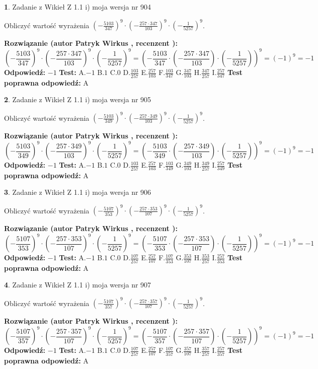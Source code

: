 \documentclass[12pt, a4paper]{article}
\theoremstyle{definition} %
\newtheorem{zad}{}
\newcommand{\zadStart}[1]{\begin{zad}#1\newline}
\newcommand{\zadStop}{\end{zad}}
\newcommand{\rozwStart}[2]{\noindent \textbf{Rozwiązanie (autor #1 , recenzent #2): }\newline}
\newcommand{\rozwStop}{\newline}
\newcommand{\odpStart}{\noindent \textbf{Odpowiedź:}\newline}
\newcommand{\odpStop}{\newline}
\newcommand{\testStart}{\noindent \textbf{Test:}\newline}
\newcommand{\testStop}{\newline}
\newcommand{\kluczStart}{\noindent \textbf{Test poprawna odpowiedź:}\newline}
\newcommand{\kluczStop}{\newline}
\begin{document}
\zadStart{Zadanie z Wikieł Z 1.1 i) moja wersja nr 904}

Obliczyć wartość wyrażenia $(-\frac{5103}{347})^{9} \cdot (-\frac{257 \cdot 347}{103})^{9} \cdot (-\frac{1}{5257})^{9}$.
\zadStop
\rozwStart{Patryk Wirkus}{}
$$(-\frac{5103}{347})^{9} \cdot (-\frac{257 \cdot 347}{103})^{9} \cdot (-\frac{1}{5257})^{9} = (-\frac{5103}{347} \cdot (-\frac{257 \cdot 347}{103}) \cdot (-\frac{1}{5257}))^{9} = (-1)^{9} = -1$$
\rozwStop
\odpStart
$-1$
\odpStop
\testStart
A.$-1$ B.$1$ C.$0$ D.$\frac{103}{257}$ E.$\frac{257}{103}$
F.$\frac{103}{347}$ G.$\frac{347}{103}$
H.$\frac{347}{257}$
I.$\frac{257}{347}$
\testStop
\kluczStart
A
\kluczStop



\zadStart{Zadanie z Wikieł Z 1.1 i) moja wersja nr 905}

Obliczyć wartość wyrażenia $(-\frac{5103}{349})^{9} \cdot (-\frac{257 \cdot 349}{103})^{9} \cdot (-\frac{1}{5257})^{9}$.
\zadStop
\rozwStart{Patryk Wirkus}{}
$$(-\frac{5103}{349})^{9} \cdot (-\frac{257 \cdot 349}{103})^{9} \cdot (-\frac{1}{5257})^{9} = (-\frac{5103}{349} \cdot (-\frac{257 \cdot 349}{103}) \cdot (-\frac{1}{5257}))^{9} = (-1)^{9} = -1$$
\rozwStop
\odpStart
$-1$
\odpStop
\testStart
A.$-1$ B.$1$ C.$0$ D.$\frac{103}{257}$ E.$\frac{257}{103}$
F.$\frac{103}{349}$ G.$\frac{349}{103}$
H.$\frac{349}{257}$
I.$\frac{257}{349}$
\testStop
\kluczStart
A
\kluczStop



\zadStart{Zadanie z Wikieł Z 1.1 i) moja wersja nr 906}

Obliczyć wartość wyrażenia $(-\frac{5107}{353})^{9} \cdot (-\frac{257 \cdot 353}{107})^{9} \cdot (-\frac{1}{5257})^{9}$.
\zadStop
\rozwStart{Patryk Wirkus}{}
$$(-\frac{5107}{353})^{9} \cdot (-\frac{257 \cdot 353}{107})^{9} \cdot (-\frac{1}{5257})^{9} = (-\frac{5107}{353} \cdot (-\frac{257 \cdot 353}{107}) \cdot (-\frac{1}{5257}))^{9} = (-1)^{9} = -1$$
\rozwStop
\odpStart
$-1$
\odpStop
\testStart
A.$-1$ B.$1$ C.$0$ D.$\frac{107}{257}$ E.$\frac{257}{107}$
F.$\frac{107}{353}$ G.$\frac{353}{107}$
H.$\frac{353}{257}$
I.$\frac{257}{353}$
\testStop
\kluczStart
A
\kluczStop



\zadStart{Zadanie z Wikieł Z 1.1 i) moja wersja nr 907}

Obliczyć wartość wyrażenia $(-\frac{5107}{357})^{9} \cdot (-\frac{257 \cdot 357}{107})^{9} \cdot (-\frac{1}{5257})^{9}$.
\zadStop
\rozwStart{Patryk Wirkus}{}
$$(-\frac{5107}{357})^{9} \cdot (-\frac{257 \cdot 357}{107})^{9} \cdot (-\frac{1}{5257})^{9} = (-\frac{5107}{357} \cdot (-\frac{257 \cdot 357}{107}) \cdot (-\frac{1}{5257}))^{9} = (-1)^{9} = -1$$
\rozwStop
\odpStart
$-1$
\odpStop
\testStart
A.$-1$ B.$1$ C.$0$ D.$\frac{107}{257}$ E.$\frac{257}{107}$
F.$\frac{107}{357}$ G.$\frac{357}{107}$
H.$\frac{357}{257}$
I.$\frac{257}{357}$
\testStop
\kluczStart
A
\kluczStop
\end{document}
